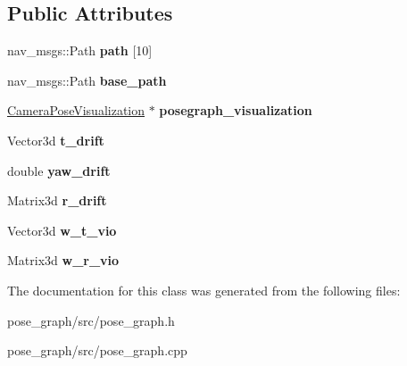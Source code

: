\subsection*{Public Attributes}
\begin{DoxyCompactItemize}
\item 
\mbox{\label{classPoseGraph_aa0fe230204d1bee342c11c97e862ded8}} 
nav\+\_\+msgs\+::\+Path {\bfseries path} \mbox{[}10\mbox{]}
\item 
\mbox{\label{classPoseGraph_af3676c60afffc3d5657a8985d3c10561}} 
nav\+\_\+msgs\+::\+Path {\bfseries base\+\_\+path}
\item 
\mbox{\label{classPoseGraph_aa7957c0701f146581d52ac3b8bd9d6a5}} 
\hyperlink{classCameraPoseVisualization}{Camera\+Pose\+Visualization} $\ast$ {\bfseries posegraph\+\_\+visualization}
\item 
\mbox{\label{classPoseGraph_a76db8fd2b01de81d3cbfcceb03d6537a}} 
Vector3d {\bfseries t\+\_\+drift}
\item 
\mbox{\label{classPoseGraph_a0ad9e7974ba52f8d95eda4b8bf7f6c78}} 
double {\bfseries yaw\+\_\+drift}
\item 
\mbox{\label{classPoseGraph_afb4dbf8941a56e13370cddfae7e3cf89}} 
Matrix3d {\bfseries r\+\_\+drift}
\item 
\mbox{\label{classPoseGraph_a02bf859d80338c578f8591908557cd80}} 
Vector3d {\bfseries w\+\_\+t\+\_\+vio}
\item 
\mbox{\label{classPoseGraph_aa6057203e6acea4a5e889e72be39d24f}} 
Matrix3d {\bfseries w\+\_\+r\+\_\+vio}
\end{DoxyCompactItemize}


The documentation for this class was generated from the following files\+:\begin{DoxyCompactItemize}
\item 
pose\+\_\+graph/src/pose\+\_\+graph.\+h\item 
pose\+\_\+graph/src/pose\+\_\+graph.\+cpp\end{DoxyCompactItemize}
